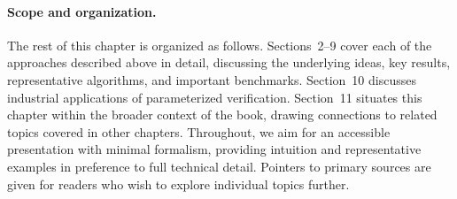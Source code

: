 \paragraph{Scope and organization.}
The rest of this chapter is organized as follows. Sections~2--9 cover each of
the approaches described above in detail, discussing the underlying ideas,
key results, representative algorithms, and important benchmarks.
Section~10 discusses industrial applications of parameterized verification.
Section~11 situates this chapter within the broader context of the book,
drawing connections to related topics covered in other chapters.
Throughout, we aim for an accessible presentation with minimal formalism,
providing intuition and representative examples in preference to full
technical detail. Pointers to primary sources are given for readers who wish
to explore individual topics further.
